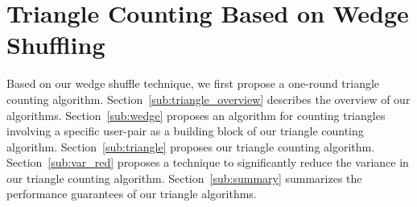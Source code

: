 \section{Triangle Counting Based on Wedge Shuffling}
\label{sec:triangle}
Based on our wedge shuffle technique, we first propose a
one-round triangle counting algorithm.
%
Section~\ref{sub:triangle_overview} describes the overview of our algorithms.
Section~\ref{sub:wedge} proposes an algorithm for counting triangles involving a specific user-pair
as a building block of our triangle counting algorithm.
Section~\ref{sub:triangle} proposes
our triangle counting algorithm.
Section~\ref{sub:var_red} proposes a technique to significantly reduce the variance in our triangle counting algorithm. 
Section~\ref{sub:summary} summarizes the performance guarantees of our triangle algorithms. 


